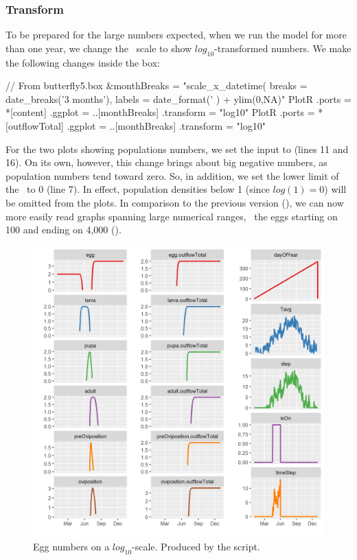 \subsubsection{Transform \yaxis}
To be prepared for the large numbers expected, when we run the model for more than one year, we change the \yaxis\ scale to show $log_{10}$-transformed numbers. We make the following changes inside the  box:

\lstset{numbers=left}
\begin{boxscript}
// From butterfly5.box
&monthBreaks = "scale_x_datetime(
                  breaks = date_breaks('3 months'), 
                  labels = date_format('%
                ) + 
                ylim(0,NA)" 
PlotR {
  .ports = *[content]
  .ggplot = ..[monthBreaks]
  .transform = "log10" 
}
PlotR {
  .ports = *[outflowTotal]
  .ggplot = ..[monthBreaks]
  .transform = "log10" 
}
\end{boxscript}
\lstset{numbers=none}

For the two plots showing populations numbers, we set the  input to  (lines 11 and 16). On its own, however, this change brings about big negative numbers, as population numbers tend toward zero. So, in addition, we set the lower limit of the \yaxis\ to 0 (line 7). In effect, population densities below 1 (since $log(1)=0$) will be omitted from the plots. In comparison to the previous version (), we can now more easily read graphs spanning large numerical ranges, \eg\ the eggs starting on 100 and ending on 4,000 ().

\begin{figure} [h]
\centering
\includegraphics[width=\textwidth]{graphics/butterfly5}
\caption{Egg numbers on a $log_{10}$-scale. Produced by the  script.}
\label{fig:butterfly5}
\end{figure}

